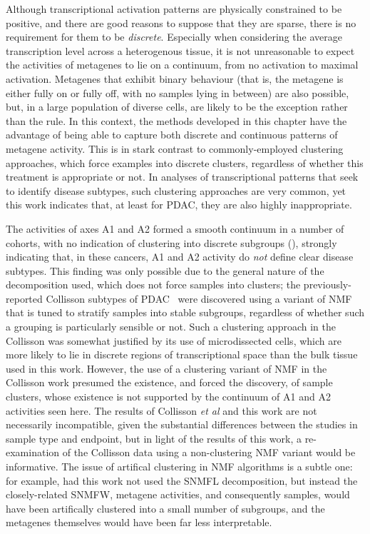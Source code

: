 \documentclass[dissertation.tex]{subfiles}
\begin{document}
Although transcriptional activation patterns are physically constrained to be positive, and there are good reasons to suppose that they are sparse, there is no requirement for them to be \emph{discrete}.  Especially when considering the average transcription level across a heterogenous tissue, it is not unreasonable to expect the activities of metagenes to lie on a continuum, from no activation to maximal activation.  Metagenes that exhibit binary behaviour (that is, the metagene is either fully on or fully off, with no samples lying in between) are also possible, but, in a large population of diverse cells, are likely to be the exception rather than the rule.  In this context, the methods developed in this chapter have the advantage of being able to capture both discrete and continuous patterns of metagene activity.  This is in stark contrast to commonly-employed clustering approaches, which force examples into discrete clusters, regardless of whether this treatment is appropriate or not.  In analyses of transcriptional patterns that seek to identify disease subtypes, such clustering approaches are very common, yet this work indicates that, at least for \gls{PDAC}, they are also highly inappropriate.

The activities of axes A1 and A2 formed a smooth continuum in a number of cohorts, with no indication of clustering into discrete subgroups (), strongly indicating that, in these cancers, A1 and A2 activity do \emph{not} define clear disease subtypes.  This finding was only possible due to the general nature of the decomposition used, which does not force samples into clusters; the previously-reported Collisson subtypes of \gls{PDAC}~\cite{Collisson2011} were discovered using a variant of \gls{NMF} that is tuned to stratify samples into stable subgroups, regardless of whether such a grouping is particularly sensible or not.  Such a clustering approach in the Collisson was somewhat justified by its use of microdissected cells, which are more likely to lie in discrete regions of transcriptional space than the bulk tissue used in this work.  However, the use of a clustering variant of \gls{NMF} in the Collisson work presumed the existence, and forced the discovery, of sample clusters, whose existence is not supported by the continuum of A1 and A2 activities seen here.  The results of Collisson \emph{et al} and this work are not necessarily incompatible, given the substantial differences between the studies in sample type and endpoint, but in light of the results of this work, a re-examination of the Collisson data using a non-clustering \gls{NMF} variant would be informative.  The issue of artifical clustering in \gls{NMF} algorithms is a subtle one: for example, had this work not used the \gls{SNMFL} decomposition, but instead the closely-related \gls{SNMFW}, metagene activities, and consequently samples, would have been artifically clustered into a small number of subgroups, and the metagenes themselves would have been far less interpretable.
\end{document}

